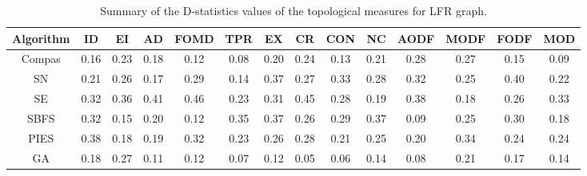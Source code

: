 \begin{table}
\centering
\caption{Summary of the D-statistics values of the topological measures for LFR graph.}
\label{tab_lfr}
\begin{adjustbox}{max width=\textwidth}
\begin{tabular}{c|c c c c c c c c c c c c c}
\hline
Algorithm & ID & EI & AD & FOMD & TPR & EX & CR & CON & NC & AODF & MODF & FODF & MOD \\ \hline
Compas    &  0.16  &  0.23  &  0.18  &  0.12    &  0.08   & 0.20   &  0.24  &  0.13   & 0.21   &  0.28    &  0.27    &   0.15   & 0.09    \\ 
SN        &  0.21  &  0.26  &  0.17  &  0.29    &  0.14   & 0.37   & 0.27   & 0.33    &  0.28  &  0.32    & 0.25     & 0.40     &  0.22   \\ 
SE        & 0.32   & 0.36   &  0.41  &   0.46   &   0.23  & 0.31   & 0.45   &  0.28   & 0.19   &   0.38   &  0.18    &  0.26    & 0.33    \\ 
SBFS      &  0.32  &  0.15  &  0.20  &  0.12    &  0.35   & 0.37   & 0.26   &  0.29   & 0.37   &   0.09   & 0.25     &  0.30    & 0.18    \\ 
PIES      & 0.38   & 0.18   &  0.19  &  0.32    &  0.23   &  0.26  & 0.28   &  0.21   & 0.25   & 0.20     & 0.34     &  0.24    &  0.24   \\ 
GA        &  0.18  &  0.27  & 0.11   & 0.12     &  0.07   & 0.12   &  0.05  &  0.06   & 0.14   &  0.08    &  0.21    &  0.17    & 0.14    \\ \hline
\end{tabular}
\end{adjustbox}
\vspace{3mm}
\end{table}

